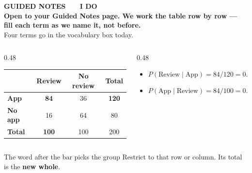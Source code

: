 \documentclass[aspectratio=169, 11pt]{beamer}
\newcommand{\redink}[1]{{\color{redacc}\bfseries #1}}
\begin{document}
{
\begin{frame}[plain]
  \vspace{1.8cm}\hspace{0.8cm}%
  \begin{minipage}{0.86\textwidth}
    {\color{goldacc}\bfseries\small GUIDED NOTES \ \textbullet\ \ I DO}\\[0.7cm]
    {\color{white}\bfseries\Large Open to your Guided Notes page. We work the table row by row
    --- fill each term as we name it, not before.}\\[0.9cm]
    {\color{frostmid}\small Four terms go in the vocabulary box today.}
  \end{minipage}
\end{frame}
}

\begin{frame}[t, plain]
  \begin{columns}[t]
    \begin{column}{0.48\textwidth}
      \begin{center}
      \renewcommand{\arraystretch}{1.3}
      \begin{tabular}{l c c c}
      \hline
       & \textbf{Review} & \textbf{No review} & \textbf{Total} \\
      \hline
      \textbf{App} & \textbf{84} & 36 & \textbf{120} \\
      \textbf{No app} & 16 & 64 & 80 \\
      \textbf{Total} & \textbf{100} & 100 & 200 \\
      \hline
      \end{tabular}
      \end{center}
    \end{column}
    \begin{column}{0.48\textwidth}
      \begin{itemize}\setlength{\itemsep}{5pt}
        \item $P(\text{Review} \mid \text{App}) = 84/120 = \mathbf{0.70}$
        \item $P(\text{App} \mid \text{Review}) = 84/100 = \mathbf{0.84}$
      \end{itemize}
    \end{column}
  \end{columns}
  \begin{block}{The word after the bar picks the group}
    Restrict to that row or column. Its total is the \redink{new whole}.
  \end{block}
\end{frame}
\end{document}
